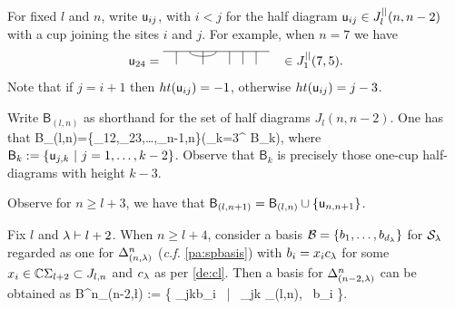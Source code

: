 \mdef   \label{de:uu} 
For fixed $l$ and $n$, write ${\mathsf u}_{ij}$, with $i<j$ for the half diagram ${\mathsf u}_{ij}\in J_l^{||}(n,n-2)$ 
with a cup joining the sites $i$ and $j$.  
For example, when $n=7$ we have 
\[
\uu_{24} =  \onecupp{8}{2}{4}{1}{3}{5}{6}{7}      \hspace{.31cm} \in J_{1}^{||}(7,5). 
\]
Note that if $j=i+1$ then $ht({\mathsf u}_{ij})=-1$, otherwise $ht({\mathsf u}_{ij})=j-3$.


\newcommand{\BBB}{{\mathsf B}}  %

\mdef 
Write $\BBB_{(l,n)}$ as shorthand for the set of half diagrams $J_{l}(n,n-2)$. One has that 
\beq
\BBB_{(l,n)}=\{\uu_{12},\uu_{23},\dots,\uu_{n-1,n}\}\cup \left(\bigcup_{k=3}^{} \BBB_k\right), \label{cupbasis}
\eq
where $\BBB_k:=\{\uu_{j,k} \ | \ j=1,\dots, k-2\}$. 
Observe that $\BBB_k$ is precisely those one-cup half-diagrams with height $k-3$. 

\mdef  \label{pa:cuprec}
Observe for $n\geq l+3$, we have that $\BBB_{(l,n+1)}= \BBB_{(l,n)}\cup \{\uu_{n,n+1}\}$.

\mdef 
Fix $l$ and $\lambda \vdash l+2$. When $n\geq l+4$, consider a basis $\mathcal{B}=\{b_1,\dots, b_{d_{\lambda}}\}$ for 
$\mathcal{S}_{\lambda}$ regarded as one for $\Delta_{(n,\lambda)}^{n}$ (\textit{c.f.} \ref{pa:spbasis})
with $b_i=x_i c_{\lambda}$ for some $x_i\in \mathbb{C} \Sigma_{l+2}\subset J_{l,n}$ and $c_{\lambda}$ as per \eqref{de:cl}. Then a basis for $\Delta^{n}_{(n-2,\lambda)}{}$ can be obtained as 
\beq
\BBB^n_{(n-2,\l)} \; := \; \{ \uu_{jk}b_i \ | \ \uu_{jk} \in \BBB_{(l,n)}, \ b_i \in {}  \}. \label{eq:basis} \eq

